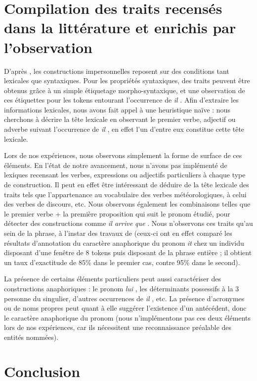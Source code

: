 \documentclass[a4paper,12pt]{article}
\begin{document}
\section{Compilation des traits recensés dans la littérature et enrichis par l'observation}
\label{approche-traits}

\color{gray}

D'après \citeauthor{danlos-ilimp-taln2005}, les constructions impersonnelles reposent sur des conditions tant lexicales que syntaxiques. Pour les propriétés syntaxiques, des traits peuvent \^etre obtenus grâce à un simple étiquetage morpho-syntaxique, et une observation de ces étiquettes pour les tokens entourant l'occurrence de \og \textit{il} \fg{}. Afin d'extraire les informations lexicales, nous avons fait appel à une heuristique naïve : nous cherchons à décrire la tête lexicale en observant le premier verbe, adjectif ou adverbe suivant l'occurrence de \og \textit{il} \fg{}, en effet l'un d'entre eux constitue cette tête lexicale.

Lors de nos expériences, nous observons simplement la forme de surface de ces éléments. En l'état de notre avancement, nous n'avons pas implémenté de lexiques recensant les verbes, expressions ou adjectifs particuliers à chaque type de construction. Il peut en effet être intéressant de déduire de la tête lexicale des traits tels que l'appartenance au vocabulaire des verbes météorologiques, à celui des verbes de discours, etc.
Nous observons également les combinaisons telles que le premier verbe + la première proposition qui suit le pronom étudié, pour détecter des constructions comme \og \textit{il arrive que} \fg{}. Nous n'observons ces traits qu'au sein de la phrase, à l'instar des travaux de \citeauthor{Bergsma-11} (ceux-ci ont en effet comparé les résultats d'annotation du caractère anaphorique du pronom \og{}\textit{it}\fg{} chez un individu disposant d'une fenêtre de 8 tokens puis disposant de la phrase entière ; il obtient un taux d'exactitude de 85\% dans le premier cas, contre 95\% dans le second).

La présence de certains éléments particuliers peut aussi caractériser des constructions anaphoriques : le pronom \og \textit{lui} \fg{}, les déterminants possessifs à la 3 personne du singulier, d'autres occurrences de \og \textit{il} \fg{}, etc. La présence d'acronymes ou de noms propres peut quant à elle suggérer l'existence d'un antécédent, donc le caractère anaphorique du pronom (nous n'implémentons pas ces deux éléments lors de nos expériences, car ils nécessitent une reconnaissance préalable des entités nommées).

\color{black}

\section*{Conclusion}





\end{document}
